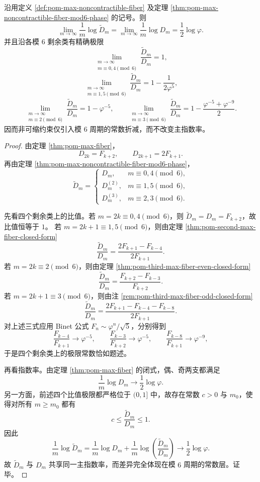 \begin{theorem}\label{thm:pom-max-noncontractible-fiber-exponent-mod6-ratio}
沿用定义 \ref{def:pom-max-noncontractible-fiber} 及定理
\ref{thm:pom-max-noncontractible-fiber-mod6-phase} 的记号。则
\[
\lim_{m\to\infty}\frac{1}{m}\log \widetilde D_m
=
\lim_{m\to\infty}\frac{1}{m}\log D_m
=
\frac{1}{2}\log\varphi.
\]
并且沿各模 \(6\) 剩余类有精确极限
\[
\lim_{\substack{m\to\infty\\ m\equiv 0,4\!\!\!\!\pmod 6}}
\frac{\widetilde D_m}{D_m}
=1,
\]
\[
\lim_{\substack{m\to\infty\\ m\equiv 1,5\!\!\!\!\pmod 6}}
\frac{\widetilde D_m}{D_m}
=1-\frac{1}{2\varphi^5},
\]
\[
\lim_{\substack{m\to\infty\\ m\equiv 2\!\!\!\!\pmod 6}}
\frac{\widetilde D_m}{D_m}
=1-\varphi^{-5},
\qquad
\lim_{\substack{m\to\infty\\ m\equiv 3\!\!\!\!\pmod 6}}
\frac{\widetilde D_m}{D_m}
=1-\frac{\varphi^{-5}+\varphi^{-9}}{2}.
\]
因而非可缩约束仅引入模 \(6\) 周期的常数折减，而不改变主指数率。
\end{theorem}
\begin{proof}
由定理 \ref{thm:pom-max-fiber}，
\[
D_{2k}=F_{k+2},
\qquad
D_{2k+1}=2F_{k+1}.
\]
再由定理 \ref{thm:pom-max-noncontractible-fiber-mod6-phase}，
\[
\widetilde D_m=
\begin{cases}
D_m, & m\equiv 0,4\pmod 6,\\[2pt]
D_m^{(2)}, & m\equiv 1,5\pmod 6,\\[2pt]
D_m^{(3)}, & m\equiv 2,3\pmod 6.
\end{cases}
\]

先看四个剩余类上的比值。若 \(m=2k\equiv 0,4\pmod 6\)，则
\(
\widetilde D_m=D_m=F_{k+2}
\)，故比值恒等于 \(1\)。
若 \(m=2k+1\equiv 1,5\pmod 6\)，则由定理 \ref{thm:pom-second-max-fiber-closed-form}
\[
\frac{\widetilde D_m}{D_m}
=
\frac{2F_{k+1}-F_{k-4}}{2F_{k+1}}.
\]
若 \(m=2k\equiv 2\pmod 6\)，则由定理 \ref{thm:pom-third-max-fiber-even-closed-form}
\[
\frac{\widetilde D_m}{D_m}
=
\frac{F_{k+2}-F_{k-3}}{F_{k+2}}.
\]
若 \(m=2k+1\equiv 3\pmod 6\)，则由注 \ref{rem:pom-third-max-fiber-odd-closed-form}
\[
\frac{\widetilde D_m}{D_m}
=
\frac{2F_{k+1}-F_{k-4}-F_{k-8}}{2F_{k+1}}.
\]
对上述三式应用 Binet 公式 \(F_n\sim \varphi^n/\sqrt5\)，分别得到
\[
\frac{F_{k-4}}{F_{k+1}}\to \varphi^{-5},
\qquad
\frac{F_{k-3}}{F_{k+2}}\to \varphi^{-5},
\qquad
\frac{F_{k-8}}{F_{k+1}}\to \varphi^{-9},
\]
于是四个剩余类上的极限常数恰如题述。

再看指数率。由定理 \ref{thm:pom-max-fiber} 的闭式，偶、奇两支都满足
\[
\frac{1}{m}\log D_m\longrightarrow \frac{1}{2}\log\varphi.
\]
另一方面，前述四个比值极限都严格位于 \((0,1]\) 中，故存在常数 \(c>0\) 与
\(m_0\)，使得对所有 \(m\ge m_0\) 都有
\[
c\le \frac{\widetilde D_m}{D_m}\le 1.
\]
因此
\[
\frac{1}{m}\log \widetilde D_m
=
\frac{1}{m}\log D_m
+\frac{1}{m}\log\!\left(\frac{\widetilde D_m}{D_m}\right)
\longrightarrow \frac{1}{2}\log\varphi.
\]
故 \(\widetilde D_m\) 与 \(D_m\) 共享同一主指数率，而差异完全体现在模 \(6\) 周期的常数层。证毕。
\end{proof}
